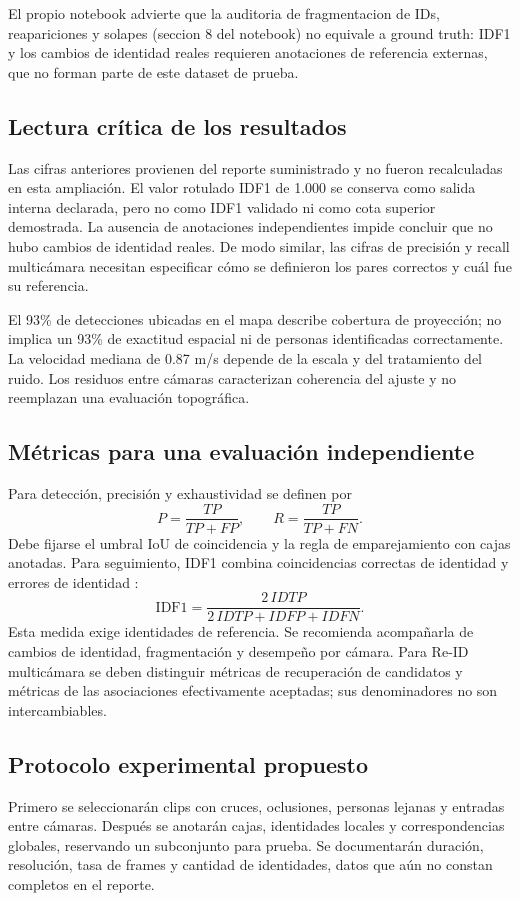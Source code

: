 \documentclass[12pt,letterpaper]{article}
\begin{document}
El propio notebook advierte que la auditoria de fragmentacion de IDs, reapariciones y solapes (seccion 8 del notebook) no equivale a ground truth: IDF1 y los cambios de identidad reales requieren anotaciones de referencia externas, que no forman parte de este dataset de prueba.


\subsection{Lectura crítica de los resultados}
Las cifras anteriores provienen del reporte suministrado y no fueron recalculadas en esta ampliación. El valor rotulado IDF1 de 1.000 se conserva como salida interna declarada, pero no como IDF1 validado ni como cota superior demostrada. La ausencia de anotaciones independientes impide concluir que no hubo cambios de identidad reales. De modo similar, las cifras de precisión y recall multicámara necesitan especificar cómo se definieron los pares correctos y cuál fue su referencia.

El 93\% de detecciones ubicadas en el mapa describe cobertura de proyección; no implica un 93\% de exactitud espacial ni de personas identificadas correctamente. La velocidad mediana de 0.87 m/s depende de la escala y del tratamiento del ruido. Los residuos entre cámaras caracterizan coherencia del ajuste y no reemplazan una evaluación topográfica.

\subsection{Métricas para una evaluación independiente}
Para detección, precisión y exhaustividad se definen por
\begin{equation}
 P=\frac{TP}{TP+FP},\qquad R=\frac{TP}{TP+FN}.
\end{equation}
Debe fijarse el umbral IoU de coincidencia y la regla de emparejamiento con cajas anotadas. Para seguimiento, IDF1 combina coincidencias correctas de identidad y errores de identidad \cite{ristani}:
\begin{equation}
 \mathrm{IDF1}=\frac{2\,IDTP}{2\,IDTP+IDFP+IDFN}.
\end{equation}
Esta medida exige identidades de referencia. Se recomienda acompañarla de cambios de identidad, fragmentación y desempeño por cámara. Para Re-ID multicámara se deben distinguir métricas de recuperación de candidatos y métricas de las asociaciones efectivamente aceptadas; sus denominadores no son intercambiables.

\subsection{Protocolo experimental propuesto}
Primero se seleccionarán clips con cruces, oclusiones, personas lejanas y entradas entre cámaras. Después se anotarán cajas, identidades locales y correspondencias globales, reservando un subconjunto para prueba. Se documentarán duración, resolución, tasa de frames y cantidad de identidades, datos que aún no constan completos en el reporte.
\end{document}
